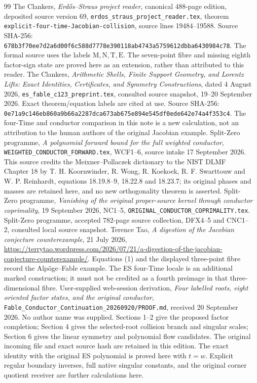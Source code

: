 \documentclass[11pt]{article}
\begin{document}
\begin{thebibliography}{99}
 The Clankers, \emph{Erd\H{o}s--Straus project reader},
canonical 488-page edition, deposited source version 69,
\texttt{erdos\_straus\_project\_reader.tex}, theorem
\texttt{explicit-four-time-Jacobian-collision}, source lines
19484--19588. Source SHA-256:
\texttt{678b3f70ee7d2a6d00f6c588d7778e390118ab4743a5759612dbba6430984c78}.
The formal source uses the labels $\mathrm M,\mathrm N,\mathrm T,\mathrm E$.
The seven-point fibre and missing eighth factor-sign state are proved
here as an extension, rather than attributed to this reader.
 The Clankers, \emph{Arithmetic Shells, Finite Support Geometry,
and Lorentz Lifts: Exact Identities, Certificates, and Symmetry Constructions},
dated 4 August 2026, \texttt{es\_fable\_c123\_preprint.tex},
consulted source snapshot, 19--20 September 2026. Exact theorem/equation
labels are cited at use. Source SHA-256:
\texttt{0e71a9c146eb860a9b66a2287dca673ab675e894e545df0ede642e74a4f353c4}.
The four-Time and conductor comparison in
this note is a new calculation, not an attribution to the human authors
of the original Jacobian example.
 Split-Zero programme, \emph{A polynomial forward bound for
the full weighted conductor}, \texttt{WEIGHTED\_CONDUCTOR\_FORWARD.tex},
WCF1--6, source intake 17 September 2026. This source credits the
Meixner--Pollaczek dictionary to the NIST DLMF Chapter 18 by T. H. Koornwinder, R. Wong, R. Koekoek, R. F. Swarttouw and W. P. Reinhardt, equations
18.19.8--9, 18.22.8 and 18.23.7; its original phases and masses are
retained here, and no new orthogonality theorem is asserted.
 Split-Zero programme, \emph{Vanishing of the original
proper-source kernel through conductor coprimality}, 19 September 2026,
NC1--5, \texttt{ORIGINAL\_CONDUCTOR\_COPRIMALITY.tex}.
 Split-Zero programme, accepted 782-page source
collection, DFX4--5 and CNC1--2, consulted local source snapshot.
 Terence Tao, \emph{A digestion of the Jacobian conjecture
counterexample}, 21 July 2026,
\url{https://terrytao.wordpress.com/2026/07/21/a-digestion-of-the-jacobian-conjecture-counterexample/}.
Equations (1) and the displayed three-point fibre record the
Alp\"oge--Fable example. The ES four-Time locale is an additional marked
construction; it must not be credited as a fourth preimage in that
three-dimensional fibre.
 User-supplied web-session derivation, \emph{Four labelled roots, eight oriented factor states, and the original conductor}, \texttt{Fable\_Conductor\_Continuation\_20260920/PROOF.md}, received 20 September 2026. No author name was supplied. Sections 1--2 give the proposed factor completion; Section 4 gives the selected-root collision branch and singular scales; Section 6 gives the linear symmetry and polynomial flow candidates. The original incoming file and exact source hash are retained in this edition. The exact identity with the original ES polynomial is proved here with $t=w$. Explicit regular boundary inverses, full native singular constants, and the original corner quotient receiver are further calculations here.

\end{thebibliography}
\end{document}
